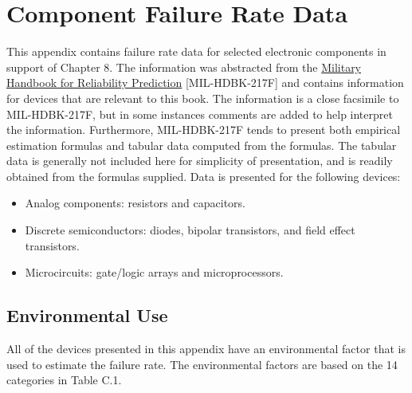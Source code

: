 \chapter{Component Failure Rate Data}
\label{appendix:componentFailureRate}
\graphicspath{ {./appendixC/Fig} }

This appendix contains failure rate data for selected electronic
components in support of Chapter 8. The information was abstracted from
the \ul{Military Handbook for Reliability Prediction}
{[}MIL-HDBK-217F{]} and contains information for devices that are
relevant to this book. The information is a close facsimile to
MIL-HDBK-217F, but in some instances comments are added to help
interpret the information. Furthermore, MIL-HDBK-217F tends to present
both empirical estimation formulas and tabular data computed from the
formulas. The tabular data is generally not included here for simplicity
of presentation, and is readily obtained from the formulas supplied.
Data is presented for the following devices:

\begin{itemize}
\item  Analog components: resistors and capacitors.
\item  Discrete semiconductors: diodes, bipolar transistors, and field effect  transistors.
\item  Microcircuits: gate/logic arrays and microprocessors.
\end{itemize}

\section{Environmental Use}
\label{section:environmental-use}

All of the devices presented in this appendix have an environmental
factor that is used to estimate the failure rate. The environmental
factors are based on the 14 categories in Table C.1.

